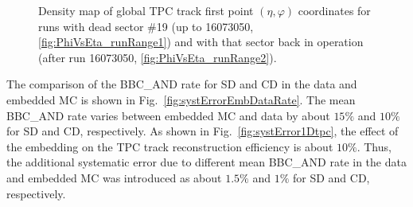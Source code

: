 \begin{figure}[h]
{\begin{subfigure}[b]{\linewidth}
  \end{subfigure}
}%
\caption[Density map of global TPC track first point $(\eta,\varphi)$ coordinates for runs with/without dead sector \#19.]%
    {Density map of global TPC track first point $(\eta,\varphi)$ coordinates for runs with dead sector \#19 (up to 16073050, \ref{fig:PhiVsEta_runRange1}) and with that sector back in operation (after run 16073050, \ref{fig:PhiVsEta_runRange2}).}\label{fig:PhiVsEtaTpcSyst}%
\end{figure}



The comparison of the BBC\_AND rate for SD and CD in the data and embedded MC is shown in Fig.~\ref{fig:systErrorEmbDataRate}. The mean BBC\_AND rate varies between embedded MC and data by about  $15\%$ and $10\%$ for SD and CD, respectively. As shown in Fig.~\ref{fig:systError1Dtpc}, 
the effect of the embedding on the TPC track reconstruction efficiency is about $10\%$.  Thus, the additional systematic error due to different mean BBC\_AND rate in the data and embedded MC was introduced as about $1.5\%$ and $1\%$ for SD and CD, respectively.
	
